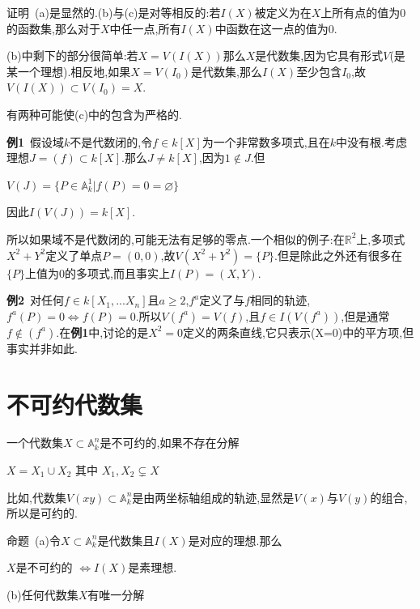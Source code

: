 \documentclass[UTF8]{book}
\begin{document}
		
		$\textbf{证明}$\ (a)是显然的.(b)与(c)是对等相反的:若$ I(X) $被定义为在$ X $上所有点的值为$ 0 $的函数集,那么对于$ X $中任一点,所有$ I(X) $中函数在这一点的值为$ 0 $.
		
		
		(b)中剩下的部分很简单:若$ X=V(I(X)) $那么$ X $是代数集,因为它具有形式$ V $(是某一个理想).相反地,如果$X=V(I_{0})$是代数集,那么$ I(X) $至少包含$I_{0}$,故$V(I(X))\subset V(I_{0})=X$.
		
		
		有两种可能使(c)中的包含为严格的.
		
		
		\textbf{例1}\ 假设域$ k $不是代数闭的,令$f\in k[X]$为一个非常数多项式,且在$ k $中没有根.考虑理想$J=(f)\subset k[X]$.那么$J\ne k[X]$,因为$1\notin J$.但
		
		
		\begin{center}
			$V(J)=\{P\in \mathbb{A}^{1}_{k}|f(P)=0=\varnothing\}$
		\end{center}
		
		
		因此$ I(V(J))=k[X] $.
		
		
		所以如果域不是代数闭的,可能无法有足够的零点.一个相似的例子:在$\mathbb{R}^{2}$上,多项式$X^{2}+Y^{2}$定义了单点$P=(0,0)$,故$V(X^{2}+Y^{2})=\{P\}$.但是除此之外还有很多在$ \{P\} $上值为$ 0 $的多项式,而且事实上$ I(P)=(X,Y) $.
		
		
		\textbf{例2}\ 对任何$f\in k[X_{1},...X_{n}]$且$a\geqslant 2$,$f^{a}$定义了与$ f $相同的轨迹,$f^{a}(P)=0\iff f(P)=0$.所以$V(f^{a})=V(f)$,且$f\in I(V(f^{a}))$,但是通常$f\notin (f^{a})$.在\textbf{例1}中,讨论的是$X^{2}=0$定义的两条直线,它只表示(X=0)中的平方项,但事实并非如此.
		
		
	\section{不可约代数集}
		一个代数集$X\subset \mathbb{A}^{n}_{k}$是不可约的,如果不存在分解
		
		
		\begin{center}
			$X=X_{1}\cup X_{2}$ 其中 $X_{1},X_{2}\varsubsetneq X$
		\end{center}
		
		
		比如,代数集$V(xy)\subset \mathbb{A}^{n}_{k}$是由两坐标轴组成的轨迹,显然是$ V(x) $与$ V(y) $的组合,所以是可约的.
		
		
		$\textbf{命题}$\ (a)令$X\subset \mathbb{A}^{n}_{k}$是代数集且$ I(X) $是对应的理想.那么
		
		
		\begin{center}
			$ X $是不可约的 $\iff I(X)$是素理想.
		\end{center}
		
		
		(b)任何代数集$ X $有唯一分解
		
\end{document}
